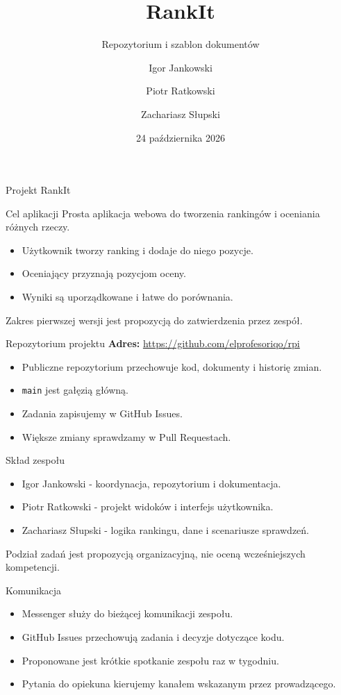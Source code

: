 \documentclass[aspectratio=169,11pt]{beamer}
\title{RankIt}
\subtitle{Repozytorium i szablon dokumentów}
\author{Igor Jankowski \and Piotr Ratkowski \and Zachariasz Słupski}
\institute{Realizacja Projektu Informatycznego 2026/2027}
\date{24 października 2026}
\begin{document}
\begin{frame}[plain]
  \titlepage
\end{frame}

\begin{frame}{Projekt RankIt}
  \begin{block}{Cel aplikacji}
    Prosta aplikacja webowa do tworzenia rankingów i oceniania różnych rzeczy.
  \end{block}
  \begin{itemize}
    \item Użytkownik tworzy ranking i dodaje do niego pozycje.
    \item Oceniający przyznają pozycjom oceny.
    \item Wyniki są uporządkowane i łatwe do porównania.
  \end{itemize}
  \vfill
  \small Zakres pierwszej wersji jest propozycją do zatwierdzenia przez zespół.
\end{frame}

\begin{frame}{Repozytorium projektu}
  \textbf{Adres:} \url{https://github.com/elprofesoriqo/rpi}
  \vspace{0.6cm}
  \begin{itemize}
    \item Publiczne repozytorium przechowuje kod, dokumenty i historię zmian.
    \item \texttt{main} jest gałęzią główną.
    \item Zadania zapisujemy w GitHub Issues.
    \item Większe zmiany sprawdzamy w Pull Requestach.
  \end{itemize}
\end{frame}

\begin{frame}{Skład zespołu}
  \begin{itemize}
    \item Igor Jankowski - koordynacja, repozytorium i dokumentacja.
    \item Piotr Ratkowski - projekt widoków i interfejs użytkownika.
    \item Zachariasz Słupski - logika rankingu, dane i scenariusze sprawdzeń.
  \end{itemize}
  \small Podział zadań jest propozycją organizacyjną, nie oceną wcześniejszych kompetencji.
\end{frame}

\begin{frame}{Komunikacja}
  \begin{itemize}
    \item Messenger służy do bieżącej komunikacji zespołu.
    \item GitHub Issues przechowują zadania i decyzje dotyczące kodu.
    \item Proponowane jest krótkie spotkanie zespołu raz w tygodniu.
    \item Pytania do opiekuna kierujemy kanałem wskazanym przez prowadzącego.
  \end{itemize}
\end{frame}
\end{document}
